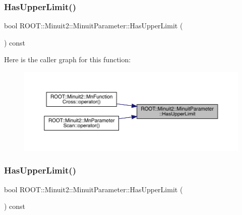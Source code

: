\mbox{\label{classROOT_1_1Minuit2_1_1MinuitParameter_a821e242fbbf23461e3b66a59126f3f02}} 
\subsubsection{\texorpdfstring{HasUpperLimit()}{HasUpperLimit()}\hspace{0.1cm}{\footnotesize\ttfamily [1/3]}}
{\footnotesize\ttfamily bool R\+O\+O\+T\+::\+Minuit2\+::\+Minuit\+Parameter\+::\+Has\+Upper\+Limit (\begin{DoxyParamCaption}{ }\end{DoxyParamCaption}) const\hspace{0.3cm}{\ttfamily [inline]}}

Here is the caller graph for this function\+:
\nopagebreak
\begin{figure}[H]
\begin{center}
\leavevmode
\includegraphics[width=350pt]{dd/dfb/classROOT_1_1Minuit2_1_1MinuitParameter_a821e242fbbf23461e3b66a59126f3f02_icgraph}
\end{center}
\end{figure}
\mbox{\label{classROOT_1_1Minuit2_1_1MinuitParameter_a821e242fbbf23461e3b66a59126f3f02}} 
\subsubsection{\texorpdfstring{HasUpperLimit()}{HasUpperLimit()}\hspace{0.1cm}{\footnotesize\ttfamily [2/3]}}
{\footnotesize\ttfamily bool R\+O\+O\+T\+::\+Minuit2\+::\+Minuit\+Parameter\+::\+Has\+Upper\+Limit (\begin{DoxyParamCaption}{ }\end{DoxyParamCaption}) const\hspace{0.3cm}{\ttfamily [inline]}}

